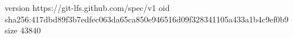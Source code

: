 version https://git-lfs.github.com/spec/v1
oid sha256:417dbd89f3b7edfec063da65ca850e946516d09f328341105a433a1b4c9ef0b9
size 43840
